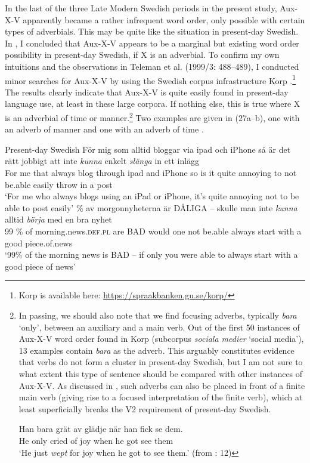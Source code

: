 \documentclass[output=paper, colorlinks, citecolor=brown]{langscibook}
\begin{document}
In the last of the three Late Modern Swedish periods in the present study, Aux-X-V apparently became a rather infrequent word order, only possible with certain types of adverbials. This may be quite like the situation in present-day Swedish. In , I concluded that Aux-X-V appears to be a marginal but existing word order possibility in present-day Swedish, if X is an adverbial. To confirm my own intuitions and the observations in Teleman et al. (1999/3: 488–489), I conducted minor searches for Aux-X-V by using the Swedish corpus infrastructure Korp \citep{BorinEtAl2012}.\footnote{Korp is available here: \url{https://spraakbanken.gu.se/korp/}}  The results clearly indicate that Aux-X-V is quite easily found in present-day language use, at least in these large corpora. If nothing else, this is true where X is an adverbial of time or manner.\footnote{In passing, we should also note that we find focusing adverbs, typically \textit{bara} ‘only’, between an auxiliary and a main verb. Out of the first 50 instances of Aux-X-V word order found in Korp (subcorpus \textit{sociala medier} ‘social media’), 13 examples contain \textit{bara} as the adverb. This arguably constitutes evidence that verbs do not form a cluster in present-day Swedish, but I am not sure to what extent this type of sentence should be compared with other instances of Aux-X-V. As discussed in \citet{BrandtlerHakansson2017}, such adverbs can also be placed in front of a finite main verb (giving rise to a focused interpretation of the finite verb), which at least superficially breaks the V2 requirement of present-day Swedish.   

\ea
\gll  Han  bara  grät  av  glädje  när  han  fick  se  dem.\\
      He  only  cried  of  joy  when  he  got  see  them\\
\glt ‘He just \textit{wept} for joy when he got to see them.’ (from \citealt{BrandtlerHakansson2017}: 12)
\z} Two examples are given in (27a–b), one with an adverb of manner  and one with an adverb of time .


\ea Present-day Swedish\label{ex:sangfelt:27}
\ea\label{ex:sangfelt:27a}
\gll För mig som alltid bloggar via ipad och iPhone så är det rätt jobbigt att inte \textit{kunna} {enkelt} \textit{slänga} in ett inlägg\\
 For me that always blog through ipad and iPhone so is it quite annoying to not be.able easily throw in a post\\
\glt ‘For me who always blogs using an iPad or iPhone, it’s quite annoying not to be able to post easily’ \citep{Bloggmix2015}
\ex \label{ex:sangfelt:27b} \% av morgonnyheterna är DÅLIGA – skulle man inte \textit{kunna} {alltid} \textit{börja} med en bra nyhet \\
                                99 \% of morning.news.\textsc{def.pl} are BAD {} would one not be.able always start with a good piece.of.news \\
\glt ‘99\% of the morning news is BAD – if only you were able to always start with a good piece of news’ \citep{Bloggmix2011}\\
\z 
\z 
\end{document}
